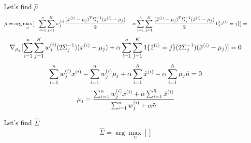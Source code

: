 \begin{answer}
Let's find $\hat{\mu}$
$$\hat{\mu} =  \arg\max_{\mu} [- \sum_{i=1}^{{n}} \sum_{j=1}^{K}  w_j^{(i)} \frac{(x^{(i)} - \mu_j)^T\Sigma_j^{-1}(x^{(i)} - \mu_j)}{2}  - \alpha \sum_{i=1}^{\tilde{{n}}} \sum_{j=1}^{K} \frac{(\tilde{x}^{(i)} - \mu_{j})^T\Sigma_{j}^{-1}(\tilde{x}^{(i)} - \mu_{j})}{2} 1\{\tilde{z}^{(i)}=j\}] = $$
$$\nabla_{\mu_j}[\sum_{i=1}^{{n}} \sum_{j=1}^{K} w_j^{(i)} (2\Sigma_j^{-1}) (x^{(i)} - \mu_j) +\alpha \sum_{i=1}^{\tilde{n}} \sum_{j=1}^{K}  1\{\tilde{z}^{(i)}=j\} (2\Sigma_j^{-1}) (\tilde{x}^{(i)} - \mu_j) ] = 0$$
$$\sum_{i=1}^{{n}} w_j^{(i)} x^{(i)} - \sum_{i=1}^{{n}}  w_j^{(i)} \mu_j +\alpha \sum_{i=1}^{\tilde{n}} \tilde{x}^{(i)} -\alpha \sum_{i=1}^{\tilde{n}} \mu_j \tilde{n} = 0$$
$$\mu_j = \frac{\sum_{i=1}^{{n}}  w_j^{(i)} x^{(i)} + \alpha \sum_{i=1}^{\tilde{n}} \tilde{x}^{(i)}}{\sum_{i=1}^{{n}} w_j^{(i)} + \alpha \tilde{n}}$$

Let's find $\hat{\Sigma}$
$$\hat{\Sigma} =  \arg\max_{\Sigma} []$$



\end{answer}
